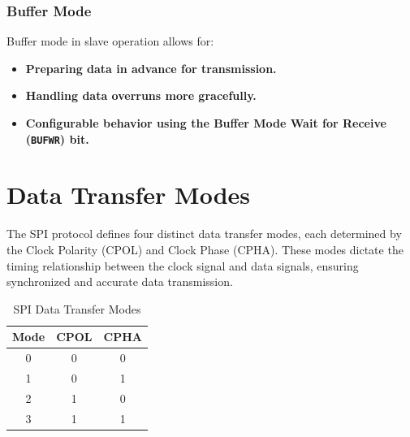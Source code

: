 \documentclass{article}
\begin{document}
\subsubsection{Buffer Mode}
Buffer mode in slave operation allows for:

\begin{itemize}
    \item \textbf{Preparing data in advance for transmission.}
    \item \textbf{Handling data overruns more gracefully.}
    \item \textbf{Configurable behavior using the Buffer Mode Wait for Receive (\texttt{BUFWR}) bit.}
\end{itemize}


\section{Data Transfer Modes}
The SPI protocol defines four distinct data transfer modes, each determined by the Clock Polarity (CPOL) and Clock Phase (CPHA). These modes dictate the timing relationship between the clock signal and data signals, ensuring synchronized and accurate data transmission.

\begin{table}[H]
    \centering
    \caption{SPI Data Transfer Modes}
    \begin{tabular}{@{}ccc@{}}
        \toprule
        \textbf{Mode} & \textbf{CPOL} & \textbf{CPHA} \\ \midrule
        0 & 0 & 0 \\
        1 & 0 & 1 \\
        2 & 1 & 0 \\
        3 & 1 & 1 \\ \bottomrule
    \end{tabular}
    \label{tab:spi_modes}
\end{table}
\end{document}
